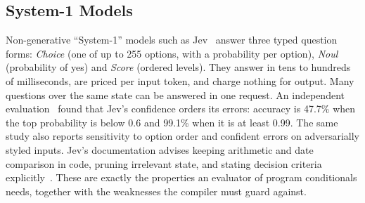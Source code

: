 \subsection{System-1 Models}
Non-generative ``System-1'' models such as Jev~\cite{typesafe2026jev} answer three typed question forms: \emph{Choice} (one of up to 255 options, with a probability per option), \emph{Noul} (probability of yes) and \emph{Score} (ordered levels). They answer in tens to hundreds of milliseconds, are priced per input token, and charge nothing for output. Many questions over the same state can be answered in one request. An independent evaluation~\cite{li2026jevjudge} found that Jev's confidence orders its errors: accuracy is 47.7\% when the top probability is below 0.6 and 99.1\% when it is at least 0.99. The same study also reports sensitivity to option order and confident errors on adversarially styled inputs. Jev's documentation advises keeping arithmetic and date comparison in code, pruning irrelevant state, and stating decision criteria explicitly~\cite{typesafe2026jev}. These are exactly the properties an evaluator of program conditionals needs, together with the weaknesses the compiler must guard against.
